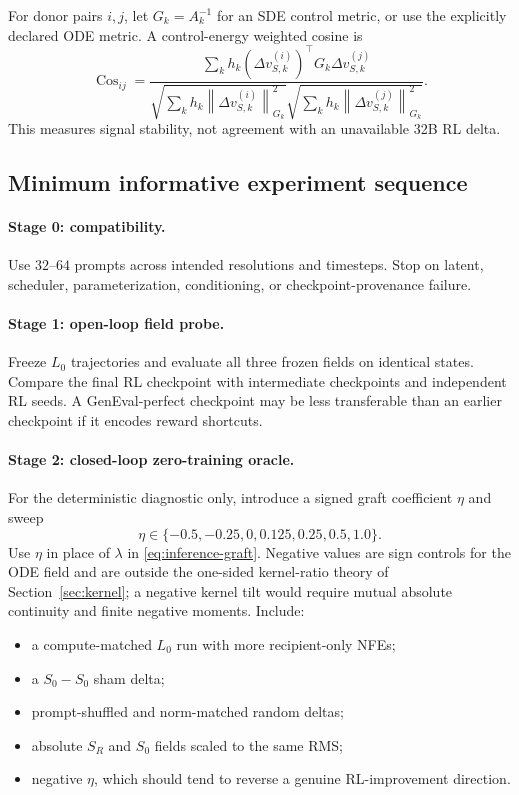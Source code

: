 \documentclass[11pt,a4paper]{article}
\newcommand{\norm}[1]{\left\lVert #1 \right\rVert}
\newcommand{\Sbase}{S_0}
\newcommand{\Srl}{S_R}
\newcommand{\Lbase}{L_0}
\theoremstyle{plain}
\theoremstyle{definition}
\begin{document}
For donor pairs $i,j$, let $G_k=A_k^{-1}$ for an SDE control metric, or use the explicitly
declared ODE metric.  A control-energy weighted cosine is
\begin{equation}
\operatorname{Cos}_{ij}
=
\frac{
\sum_k h_k
(\Delta v_{S,k}^{(i)})^\top G_k\Delta v_{S,k}^{(j)}
}{
\sqrt{\sum_k h_k\norm{\Delta v_{S,k}^{(i)}}_{G_k}^2}
\sqrt{\sum_k h_k\norm{\Delta v_{S,k}^{(j)}}_{G_k}^2}
}.
\label{eq:delta-cosine}
\end{equation}
This measures signal stability, not agreement with an unavailable 32B RL delta.

\subsection{Minimum informative experiment sequence}

\paragraph{Stage 0: compatibility.}
Use $32$--$64$ prompts across intended resolutions and timesteps.  Stop on latent, scheduler,
parameterization, conditioning, or checkpoint-provenance failure.

\paragraph{Stage 1: open-loop field probe.}
Freeze $\Lbase$ trajectories and evaluate all three frozen fields on identical states.  Compare
the final RL checkpoint with intermediate checkpoints and independent RL seeds.  A GenEval-perfect
checkpoint may be less transferable than an earlier checkpoint if it encodes reward shortcuts.

\paragraph{Stage 2: closed-loop zero-training oracle.}
For the deterministic diagnostic only, introduce a signed graft coefficient $\eta$ and sweep
\begin{equation}
\eta\in
\{-0.5,-0.25,0,0.125,0.25,0.5,1.0\}.
\label{eq:signed-graft-sweep}
\end{equation}
Use $\eta$ in place of $\lambda$ in \eqref{eq:inference-graft}.  Negative values are sign controls
for the ODE field and are outside the one-sided kernel-ratio theory of
Section~\ref{sec:kernel}; a negative kernel tilt would require mutual absolute continuity and
finite negative moments.
Include:
\begin{itemize}[leftmargin=1.6em]
\item a compute-matched $\Lbase$ run with more recipient-only NFEs;
\item a $\Sbase-\Sbase$ sham delta;
\item prompt-shuffled and norm-matched random deltas;
\item absolute $\Srl$ and $\Sbase$ fields scaled to the same RMS;
\item negative $\eta$, which should tend to reverse a genuine RL-improvement direction.
\end{itemize}
\end{document}
